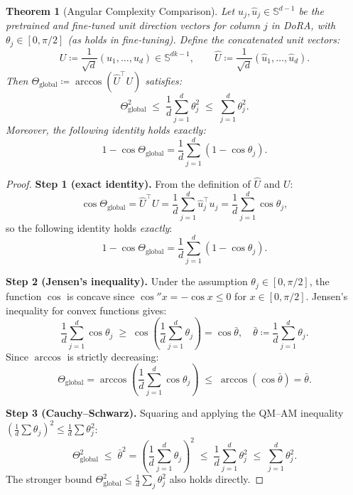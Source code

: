 \documentclass[11pt]{article}
\newtheorem{theorem}{Theorem}[section]
\newcommand{\Sd}{\mathbb{S}^{d-1}}
\begin{document}
\begin{theorem}[Angular Complexity Comparison]
\label{thm:comparison}
Let $u_j, \hat{u}_j \in \Sd$ be the pretrained and fine-tuned unit
direction vectors for column $j$ in DoRA, with $\theta_j \in [0, \pi/2]$
(as holds in fine-tuning).
Define the concatenated unit vectors:
\[
  U \coloneqq \frac{1}{\sqrt{d}}(u_1, \ldots, u_d) \in \mathbb{S}^{dk-1},
  \qquad
  \hat{U} \coloneqq \frac{1}{\sqrt{d}}(\hat{u}_1, \ldots, \hat{u}_d).
\]
Then $\Theta_{\mathrm{global}} \coloneqq \arccos(\hat{U}^\top U)$ satisfies:
\begin{equation}\label{eq:thm_comparison}
  \Theta_{\mathrm{global}}^2
  \;\leq\; \frac{1}{d}\sum_{j=1}^d \theta_j^2
  \;\leq\; \sum_{j=1}^d \theta_j^2.
\end{equation}
Moreover, the following identity holds exactly:
\begin{equation}\label{eq:cos_identity}
  1 - \cos\Theta_{\mathrm{global}}
  = \frac{1}{d}\sum_{j=1}^d (1 - \cos\theta_j).
\end{equation}
\end{theorem}

\begin{proof}
\textbf{Step 1 (exact identity).}
From the definition of $\hat{U}$ and $U$:
\[
  \cos\Theta_{\mathrm{global}} = \hat{U}^\top U
  = \frac{1}{d}\sum_{j=1}^d \hat{u}_j^\top u_j
  = \frac{1}{d}\sum_{j=1}^d \cos\theta_j,
\]
so the following identity holds \emph{exactly}:
\begin{equation}
  1 - \cos\Theta_{\mathrm{global}}
  = \frac{1}{d}\sum_{j=1}^d (1 - \cos\theta_j).
  \label{eq:cos_id_proof}
\end{equation}

\textbf{Step 2 (Jensen's inequality).}
Under the assumption $\theta_j \in [0,\pi/2]$, the function $\cos$ is
concave since $\cos'' x = - \cos x \le 0$ for $x \in [0,\pi/2]$.  Jensen's inequality for convex functions gives:
\[
  \frac{1}{d}\sum_{j=1}^d \cos\theta_j
  \;\geq\; \cos\!\left(\frac{1}{d}\sum_{j=1}^d \theta_j\right)
  = \cos\bar\theta,
  \quad \bar\theta \coloneqq \frac{1}{d}\sum_{j=1}^d \theta_j.
\]
Since $\arccos$ is strictly decreasing:
\[
  \Theta_{\mathrm{global}}
  = \arccos\!\left(\frac{1}{d}\sum_{j=1}^d\cos\theta_j\right)
  \;\leq\; \arccos(\cos\bar\theta)
  = \bar\theta.
\]

\textbf{Step 3 (Cauchy--Schwarz).}
Squaring and applying the QM--AM inequality
$(\frac{1}{d}\sum\theta_j)^2 \leq \frac{1}{d}\sum\theta_j^2$:
\[
  \Theta_{\mathrm{global}}^2
  \;\leq\; \bar\theta^2
  = \left(\frac{1}{d}\sum_{j=1}^d\theta_j\right)^{\!2}
  \;\leq\; \frac{1}{d}\sum_{j=1}^d\theta_j^2
  \;\leq\; \sum_{j=1}^d\theta_j^2.
\]
The stronger bound $\Theta_{\mathrm{global}}^2 \leq \frac{1}{d}\sum_j\theta_j^2$
also holds directly.
\end{proof}
\end{document}
